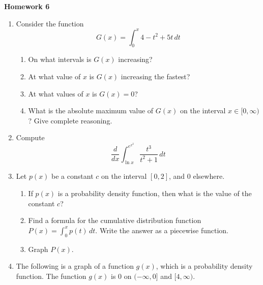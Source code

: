 \documentclass{article}
\begin{document}
\begin{center}
    \large \textbf{Homework 6}
\end{center}
                \begin{enumerate}
                    \item Consider the function
                    $$G(x) = \int_0^x 4-t^2+5t\,dt$$
                    \begin{enumerate}
                        \item On what intervals is $G(x)$ increasing?
                        \item At what value of $x$ is $G(x)$ increasing the fastest?
                        \item At what values of $x$ is $G(x)=0$?
                        \item What is the absolute maximum value of $G(x)$ on the interval $x \in [0,\infty)$? Give complete reasoning.
                    \end{enumerate}
                    \item Compute
                    $$\frac{d}{dx} \int_{\ln{x}}^{e^{x^2}} \frac{t^3}{t^2+1}\,dt$$
                    \item Let $p(x)$ be a constant $c$ on the interval $[0,2]$, and $0$ elsewhere.
                    \begin{enumerate}
                        \item If $p(x)$ is a probability density function, then what is the value of the constant $c$?
                        \item Find a formula for the cumulative distribution function $\displaystyle P(x)=\int_0^x p(t)\,dt$. Write the answer as a piecewise function. 
                        \item Graph $P(x)$.
                        
                    \end{enumerate}
                \item The following is a graph of a function $g(x)$, which is a probability density function. The function $g(x)$ is $0$ on $(-\infty,0]$ and $[4,\infty)$.
                        \begin{center}
\end{center}
\end{enumerate}
\end{document}
